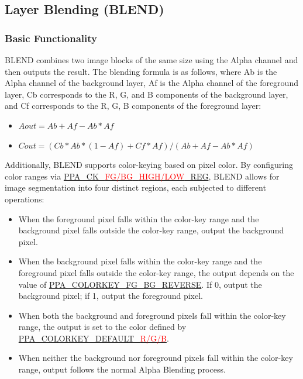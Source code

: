 \documentclass[main\_\_EN.tex]{subfiles}
\begin{document}
\begin{longtable}[c]{ |p{2.2cm}|p{2.2cm}|p{2.2cm}|p{2.2cm}|p{2.2cm}|p{2.2cm}| }
\end{longtable}

\subsection{Layer Blending (BLEND)}

\subsubsection{Basic Functionality}

BLEND combines two image blocks of the same size using the Alpha channel and then outputs the result. The blending formula is as follows, where Ab is the Alpha channel of the background layer, Af is the Alpha channel of the foreground layer, Cb corresponds to the R, G, and B components of the background layer, and Cf corresponds to the R, G, B components of the foreground layer:

\begin{itemize}
    \item $Aout = Ab + Af - Ab*Af$
    \item $Cout = (Cb*Ab*(1-Af) + Cf*Af) / (Ab + Af - Ab*Af)$
\end{itemize}

Additionally, BLEND supports color-keying based on pixel color. By configuring color ranges via \hyperref[regdesc:PPACKBGLOWREG]{PPA\_CK\_\textcolor{red}{FG/BG}\_\textcolor{red}{HIGH/LOW}\_REG}, BLEND allows for image segmentation into four distinct regions, each subjected to different operations:

\begin{itemize}
    \item When the foreground pixel falls within the color-key range and the background pixel falls outside the color-key range, output the background pixel.
    \item When the background pixel falls within the color-key range and the foreground pixel falls outside the color-key range, the output depends on the value of \hyperref[fielddesc:PPACOLORKEYFGBGREVERSE]{PPA\_COLORKEY\_FG\_BG\_REVERSE}. If 0, output the background pixel; if 1, output the foreground pixel.
    \item When both the background and foreground pixels fall within the color-key range, the output is set to the color defined by \hyperref[fielddesc:PPACOLORKEYDEFAULTB]{PPA\_COLORKEY\_DEFAULT\_\textcolor{red}{R/G/B}}.
    \item When neither the background nor foreground pixels fall within the color-key range, output follows the normal Alpha Blending process.
\end{itemize}
\end{document}
